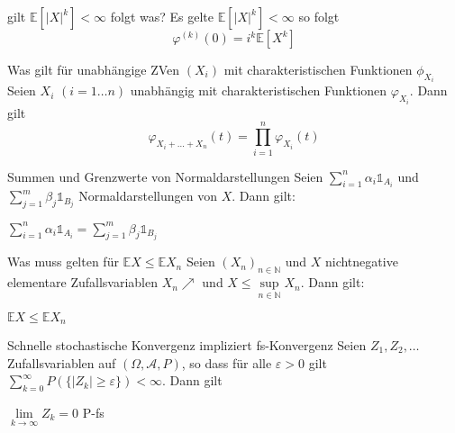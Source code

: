 \documentclass[avery5371,grid,frame]{flashcards} %
\newcommand{\1}{ \mathbb{1} } %
\begin{document}
\begin{flashcard}[Lemma]{gilt $\mathbb{E}\left[\left|X\right|^{k}\right]<\infty$ folgt was?}
  Es gelte $\mathbb{E}\left[\left|X\right|^{k}\right]<\infty$ so folgt
  \[
  \varphi^{\left(k\right)}\left(0\right)=i^{k}\mathbb{E}\left[X^{k}\right]
  \]

\end{flashcard}

\begin{flashcard}[Lemma]{Was gilt für unabhängige ZVen $(X_i)$ mit
    charakteristischen Funktionen $\phi_{X_i}$}
  Seien $X_{i}$ $\left(i=1\ldots n\right)$ unabhängig mit charakteristischen
  Funktionen $\varphi_{X_{i}}$. Dann gilt
  \[
  \varphi_{X_{i}+\ldots+X_{n}}\left(t\right)=\prod_{i=1}^{n}\varphi_{X_{i}}\left(t\right)
  \]

\end{flashcard}

\begin{flashcard}[Lemma]{Summen und Grenzwerte von Normaldarstellungen}
  Seien $\sum\limits_{i=1}^n \alpha_i \1_{A_i}$ und
  $\sum\limits_{j=1}^m\beta_j\1_{B_j}$ Normaldarstellungen von
  $X$. Dann gilt:
  \begin{center}
    $\sum\limits_{i=1}^n \alpha_i
    \1_{A_i}=\sum\limits_{j=1}^m\beta_j\1_{B_j}$
  \end{center}
\end{flashcard}

\begin{flashcard}[Lemma]{Was muss gelten für $\mathbb{E}X\leq \mathbb{E}X_n$}
  Seien $(X_n)_{n\in \mathbb{N}}$ und $X$ nichtnegative elementare Zufallsvariablen
  $X_n\nearrow$ und $X\leq \sup\limits_{n\in \mathbb{N}} X_n$. Dann
  gilt:
  \begin{center}
    $\mathbb{E}X\leq \mathbb{E}X_n$
  \end{center}
\end{flashcard}

\begin{flashcard}[Lemma]{Schnelle stochastische Konvergenz impliziert fs-Konvergenz}
  Seien $Z_1, Z_2,\ldots$ Zufallsvariablen auf $(\Omega,\mathcal{A},P)$, so dass
  für alle $\varepsilon >0$ gilt $\sum\limits_{k=0}^\infty P(\{|Z_k|\geq
  \varepsilon\})< \infty $. Dann gilt
  \begin{center}
    $\lim\limits_{k \to \infty} Z_k=0$ P-fs
  \end{center}
\end{flashcard}
\end{document}
